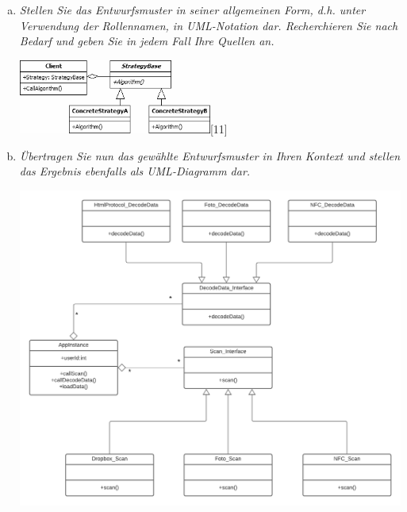 \begin{enumerate}[(a)]
\begin{itemize}
    \end{itemize}
    
    \item {\itshape Stellen Sie das Entwurfsmuster in seiner allgemeinen Form, d.h. unter Verwendung der Rollennamen, in UML-Notation dar. Recherchieren Sie nach Bedarf und geben Sie in jedem Fall Ihre Quellen an.}
    \begin{center}
       \includegraphics[width=0.5\textwidth]{src/u8/Strategy.png}[11] 
    \end{center}
    


    \item {\itshape Übertragen Sie nun das gewählte Entwurfsmuster in Ihren  Kontext und stellen das Ergebnis ebenfalls als UML-Diagramm dar.}
    \begin{center}
       \includegraphics[width=1\textwidth]{src/u8/task2/8_2.png} 
    \end{center}


\end{enumerate}
